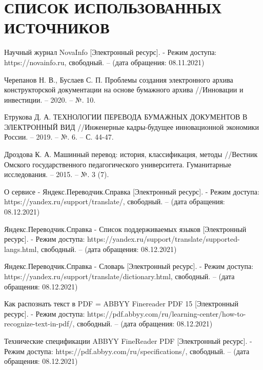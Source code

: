 \section*{СПИСОК ИСПОЛЬЗОВАННЫХ ИСТОЧНИКОВ}

\begingroup
\renewcommand{\section}[2]{}
\begin{thebibliography}{}

	Научный журнал NovaInfo [Электронный ресурс]. - Режим доступа: https://novainfo.ru, свободный. –
	(дата обращения: 08.11.2021)
	
	Черепанов Н. В., Буслаев С. П. Проблемы создания электронного архива конструкторской документации на основе бумажного архива //Инновации и инвестиции. – 2020. – №. 10.
	
	Етрукова Д. А. ТЕХНОЛОГИИ ПЕРЕВОДА БУМАЖНЫХ ДОКУМЕНТОВ В ЭЛЕКТРОННЫЙ ВИД //Инженерные кадры-будущее инновационной экономики России. – 2019. – №. 6. – С. 44-47.
	
	Дроздова К. А. Машинный перевод: история, классификация, методы //Вестник Омского государственного педагогического университета. Гуманитарные исследования. – 2015. – №. 3 (7).
	
	О сервисе - Яндекс.Переводчик.Справка  [Электронный ресурс]. - Режим доступа: https://yandex.ru/support/translate/, свободный. – (дата обращения: 08.12.2021)
	
	Яндекс.Переводчик.Справка - Список поддерживаемых языков [Электронный ресурс]. - Режим доступа: https://yandex.ru/support/translate/supported-langs.html, свободный. – (дата обращения: 08.12.2021)
	
	Яндекс.Переводчик.Справка - Словарь [Электронный ресурс]. - Режим доступа: https://yandex.ru/support/translate/dictionary.html, свободный. – (дата обращения: 08.12.2021)
	
	Как распознать текст в PDF = ABBYY Finereader PDF 15 [Электронный ресурс]. - Режим доступа: https://pdf.abbyy.com/ru/learning-center/how-to-recognize-text-in-pdf/, свободный. – (дата обращения: 08.12.2021)
	
	Технические спецификации ABBYY FineReader PDF [Электронный ресурс]. - Режим доступа: https://pdf.abbyy.com/ru/specifications/, свободный. – (дата обращения: 08.12.2021)
	

\end{thebibliography}

